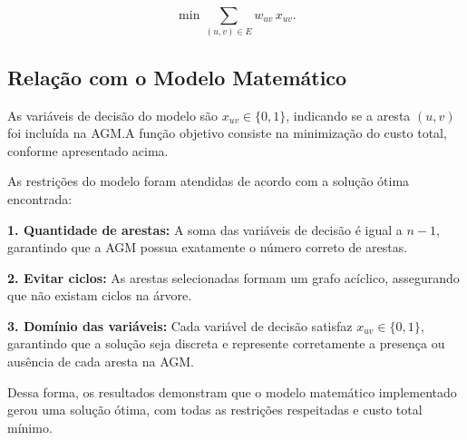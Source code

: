 \[
    \min \sum_{(u,v)\in E} w_{uv} \, x_{uv}.
\]

\subsection{Relação com o Modelo Matemático}%
\label{sec:relacao_modelo}

As variáveis de decisão do modelo são \(x_{uv} \in \{0,1\}\), indicando se a aresta \((u,v)\) foi incluída na AGM.\@ A função objetivo consiste na minimização do custo total, conforme apresentado acima.

As restrições do modelo foram atendidas de acordo com a solução ótima encontrada:

\textbf{1. Quantidade de arestas:} A soma das variáveis de decisão é igual a \(n-1\), garantindo que a AGM possua exatamente o número correto de arestas.

\textbf{2. Evitar ciclos:} As arestas selecionadas formam um grafo acíclico, assegurando que não existam ciclos na árvore.

\textbf{3. Domínio das variáveis:} Cada variável de decisão satisfaz \(x_{uv} \in \{0,1\}\), garantindo que a solução seja discreta e represente corretamente a presença ou ausência de cada aresta na AGM.\@

Dessa forma, os resultados demonstram que o modelo matemático implementado gerou uma solução ótima, com todas as restrições respeitadas e custo total mínimo.
